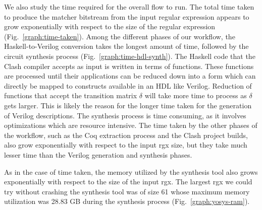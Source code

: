 We also study the time required for the overall flow to run.
The total time taken to produce the matcher bitstream from the input
regular expression appears to grow exponentially with respect to the
size of the regular expression (Fig.~\ref{graph:time-taken}).
Among the different phases of our workflow, the Haskell-to-Verilog
conversion takes the longest amount of time, followed by the circuit
synthesis process (Fig.~\ref{graph:time-hdl-synth}).
The Haskell code that the Clash compiler accepts as input is written
in terms of functions.
These functions are processed until their applications can be reduced
down into a form which can directly be mapped to constructs available
in an \gls{HDL} like Verilog.
Reduction of functions that accept the transition matrix $\delta$
will take more time to process as $\delta$ gets larger.
This is likely the reason for the longer time taken for the generation
of Verilog descriptions.
%
%
The synthesis process is time consuming, as it involves optimizations
which are resource intensive.
%
The time taken by the other phases of the workflow, such as the Coq extraction
process and the Clash project builds, also grow exponentially with respect
to the input \gls{rgx} size, but they take much lesser time than the
Verilog generation and synthesis phases.



As in the case of time taken, the memory utilized by the synthesis
tool also grows exponentially with respect to the size of the input
\gls{rgx}.
The largest \gls{rgx} we could try without crashing the synthesis tool
was of size 61 whose maximum memory utilization was 28.83 GB during
the synthesis process (Fig.~\ref{graph:yosys-ram}).

